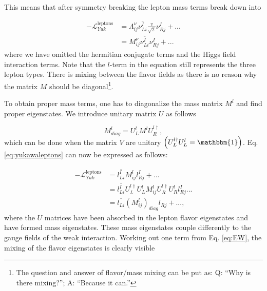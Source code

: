 This means that after symmetry breaking the lepton mass terms break down into

\begin{equation}
\label{eq:yukawaleptons}
\begin{split}
-\mathcal{L}^{\textrm{leptons}}_{Yuk} &= \Lambda^\nu_{ij}\overline{\nu^I_{Li}} \frac{v}{\sqrt{2}}\nu^I_{Rj} + ...\\
&= M^\nu_{ij} \overline{\nu^I_{Li}} \nu^I_{Rj} + ...
\end{split}
\end{equation}
where we have omitted the hermitian conjugate terms and the Higgs field interaction terms. Note that the $l$-term in the equation still represents the three lepton types. There is mixing between the flavor fields as there is no reason why the matrix $M$ should be diagonal\footnote{The question and answer of flavor/mass mixing can be put as: Q: ``Why is there mixing?''; A: ``Because it can.''}.

To obtain proper mass terms, one has to diagonalize the mass matrix $M^l$ and find proper eigenstates. We introduce unitary matrix $U$ as follows

\begin{equation}
M^l_{diag} = U^l_L M^l U^{l\dagger}_R,
\end{equation}
which can be done when the matrix $V$ are unitary $\left(U^{l\dagger}_L U^{l}_L = \mathbbm{1}\right)$. Eq. \ref{eq:yukawaleptons} can now be expressed as follows:

\begin{equation}
\begin{split}
-\mathcal{L}^{\textrm{leptons}}_{Yuk} &= \overline{l^I_{Li}} M^l_{ij} l^I_{Rj} + ...\\
&= \overline{l^I_{Li}} U^{l\dagger}_L U^l_L M^l_{ij} U^{l\dagger}_R U^{l}_R l^I_{Rj} ...\\
&= \overline{l_{Li}} \left(M^l_{ij}\right)_{diag} l_{Rj} + ...,
\end{split}
\end{equation}
where the $U$ matrices have been absorbed in the lepton flavor eigenstates and have formed mass eigenstates. These mass eigenstates couple differently to the gauge fields of the weak interaction. Working out one term from Eq. \ref{eq:EW}, the mixing of the flavor eigenstates is clearly visible

